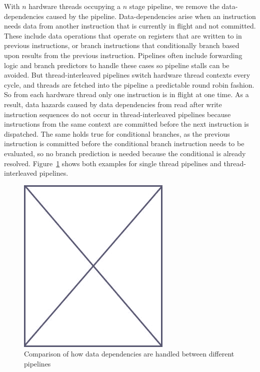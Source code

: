With $n$ hardware threads occupying a $n$ stage pipeline, we remove the data-dependencies caused by the pipeline.
Data-dependencies arise when an instruction needs data from another instruction that is currently in flight and not committed. 
These include data operations that operate on registers that are written to in previous instructions, or branch instructions that conditionally branch based upon results from the previous instruction.   
Pipelines often include forwarding logic and branch predictors to handle these cases so pipeline stalls can be avoided.
But thread-interleaved pipelines switch hardware thread contexts every cycle, and threads are fetched into the pipeline a predictable round robin fashion.
So from each hardware thread only one instruction is in flight at one time. 
As a result, data hazards caused by data dependencies from read after write instruction sequences do not occur in thread-interleaved pipelines because instructions from the same context are committed before the next instruction is dispatched.
The same holds true for conditional branches, as the previous instruction is committed before the conditional branch instruction needs to be evaluated, so no branch prediction is needed because the conditional is already resolved.       
Figure~\ref{fig:hazard_comparison_between_pipelines} shows both examples for single thread pipelines and thread-interleaved pipelines.      
\begin{figure}
\begin{center}
\includegraphics[scale=.4]{figs/placeholder}
\end{center}
\caption{Comparison of how data dependencies are handled between different pipelines}
\label{fig:hazard_comparison_between_pipelines}
\end{figure}

